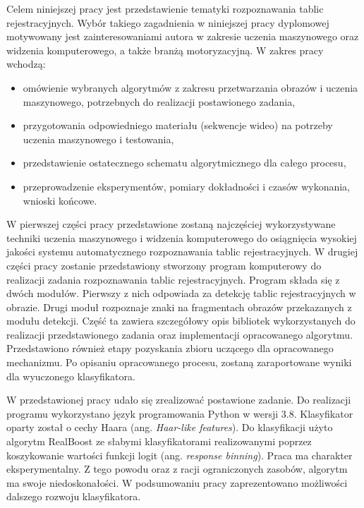 Celem niniejszej pracy jest przedstawienie tematyki rozpoznawania tablic rejestracyjnych.
Wybór takiego zagadnienia w niniejszej pracy dyplomowej motywowany jest zainteresowaniami autora w zakresie uczenia maszynowego oraz widzenia komputerowego, a także branżą motoryzacyjną.
W zakres pracy wchodzą:
\begin{itemize}
    \item omówienie wybranych algorytmów z zakresu przetwarzania obrazów i uczenia maszynowego, potrzebnych do realizacji postawionego zadania,
    \item przygotowania odpowiedniego materiału (sekwencje wideo) na potrzeby uczenia maszynowego i testowania,
    \item przedstawienie ostatecznego schematu algorytmicznego dla całego procesu,
    \item przeprowadzenie eksperymentów, pomiary dokładności i czasów wykonania, wnioski końcowe.
\end{itemize}

W pierwszej części pracy przedstawione zostaną najczęściej wykorzystywane techniki uczenia maszynowego i widzenia komputerowego do osiągnięcia wysokiej jakości systemu automatycznego rozpoznawania tablic rejestracyjnych.
W drugiej części pracy zostanie przedstawiony stworzony program komputerowy do realizacji zadania rozpoznawania tablic rejestracyjnych.
Program składa się z dwóch modułów.
Pierwszy z nich odpowiada za detekcję tablic rejestracyjnych w obrazie.
Drugi moduł rozpoznaje znaki na fragmentach obrazów przekazanych z modułu detekcji.
Część ta zawiera szczegółowy opis bibliotek wykorzystanych do realizacji przedstawionego zadania oraz implementacji opracowanego algorytmu.
Przedstawiono również etapy pozyskania zbioru uczącego dla opracowanego mechanizmu.
Po opisaniu opracowanego procesu, zostaną zaraportowane wyniki dla wyuczonego klasyfikatora.

W przedstawionej pracy udało się zrealizować postawione zadanie.
Do realizacji programu wykorzystano język programowania Python w wersji 3.8.
Klasyfikator oparty został o cechy Haara (ang. \textit{Haar-like features}).
Do klasyfikacji użyto algorytm RealBoost ze słabymi klasyfikatorami realizowanymi poprzez koszykowanie wartości funkcji logit (ang. \textit{response binning}).
Praca ma charakter eksperymentalny.
Z tego powodu oraz z racji ograniczonych zasobów, algorytm ma swoje niedoskonałości.
W podsumowaniu pracy zaprezentowano możliwości dalszego rozwoju klasyfikatora.
%
